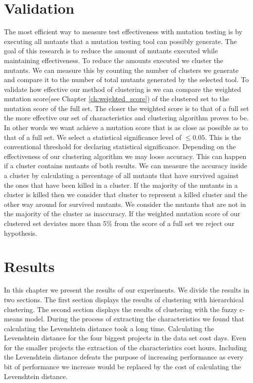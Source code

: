 \documentclass[conference,draftclsnofoot,onecolumn]{IEEEtran}
\begin{document}
\section{Validation}
\label{ch:exp1_validation}
The most efficient way to measure test effectiveness with mutation testing is by executing all mutants that a mutation testing tool can possibly generate.
The goal of this research is to reduce the amount of mutants executed while maintaining effectiveness.
To reduce the amounts executed we cluster the mutants. 
We can measure this by counting the number of clusters we generate and compare it to the number of total mutants generated by the selected tool.
\newline
To validate how effective our method of clustering is we can compare the weighted mutation score(see Chapter \ref{ch:weighted_score}) of the clustered set to the mutation score of the full set.
The closer the weighted score is to that of a full set the more effective our set of characteristics and clustering algorithm proves to be.
In other words we want achieve a mutation score that is as close as possible as to that of a full set.
We select a statistical significance level of $\leq 0.05$.
This is the conventional threshold for declaring statistical significance\cite{Kirk1996PracticalCome}.
\newline
Depending on the effectiveness of our clustering algorithm we may loose accuracy.
This can happen if a cluster contains mutants of both results. 
We can measure the accuracy inside a cluster by calculating a percentage of all mutants that have survived against the ones that have been killed in a cluster.
If the majority of the mutants in a cluster is killed then we consider that cluster to represent a killed cluster and the other way around for survived mutants.
We consider the mutants that are not in the majority of the cluster as inaccuracy.
\newline
If the weighted mutation score of our clustered set deviates more than 5\% from the score of a full set we reject our hypothesis.

\section{Results}
\label{ch:results}
In this chapter we present the results of our experiments.
We divide the results in two sections. 
The first section displays the results of clustering with hierarchical clustering.
The second section displays the results of clustering with the fuzzy c-means model.
\newline
During the process of extracting the characteristics we found that calculating the Levenshtein distance took a long time\cite{thesis}.
Calculating the Levenshtein distance for the four biggest projects in the data set cost days\cite{thesis}.
Even for the smaller projects the extraction of the characteristics cost hours\cite{thesis}.
Including the Levenshtein distance defeats the purpose of increasing performance as every bit of performance we increase would be replaced by the cost of calculating the Levenshtein distance\cite{thesis}.
\end{document}
